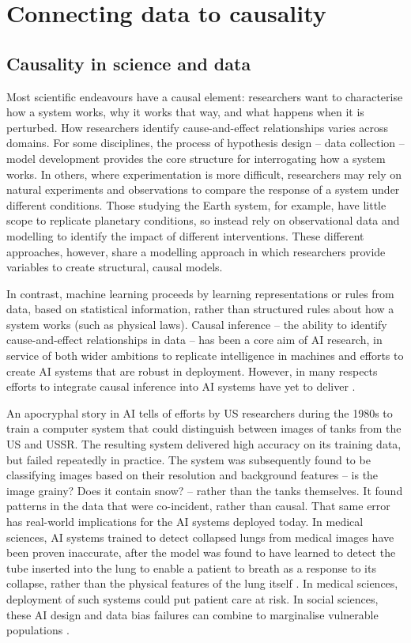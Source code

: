 \section{Connecting data to causality}\label{connecting-data-to-causality}

\subsection{Causality in science and data}\label{causality-in-science-and-data}

Most scientific endeavours have a causal element: researchers want to
characterise how a system works, why it works that way, and what happens
when it is perturbed. How researchers identify cause-and-effect
relationships varies across domains. For some disciplines, the process
of hypothesis design -- data collection -- model development provides
the core structure for interrogating how a system works. In others,
where experimentation is more difficult, researchers may rely on natural
experiments and observations to compare the response of a system under
different conditions. Those studying the Earth system, for example, have
little scope to replicate planetary conditions, so instead rely on
observational data and modelling to identify the impact of different
interventions. These different approaches, however, share a modelling
approach in which researchers provide variables to create structural,
causal models.

In contrast, machine learning proceeds by learning representations or
rules from data, based on statistical information, rather than
structured rules about how a system works (such as physical laws).
Causal inference -- the ability to identify cause-and-effect
relationships in data -- has been a core aim of AI research, in service
of both wider ambitions to replicate intelligence in machines and
efforts to create AI systems that are robust in deployment. However, in
many respects efforts to integrate causal inference into AI systems have
yet to deliver \cite{Scholkopf-representation21}.

An apocryphal story in AI tells of efforts by US researchers during the
1980s to train a computer system that could distinguish between images
of tanks from the US and USSR. The resulting system delivered high
accuracy on its training data, but failed repeatedly in practice. The
system was subsequently found to be classifying images based on their
resolution and background features -- is the image grainy? Does it
contain snow? -- rather than the tanks themselves. It found patterns in
the data that were co-incident, rather than causal. That same error has
real-world implications for the AI systems deployed today. In medical
sciences, AI systems trained to detect collapsed lungs from medical
images have been proven inaccurate, after the model was found to have
learned to detect the tube inserted into the lung to enable a patient to
breath as a response to its collapse, rather than the physical features
of the lung itself \cite{Rueckel-impact20}.
In medical sciences, deployment of such systems could put patient care
at risk. In social sciences, these AI design and data bias failures can
combine to marginalise vulnerable populations \cite{Emspak-prejudice16}.

